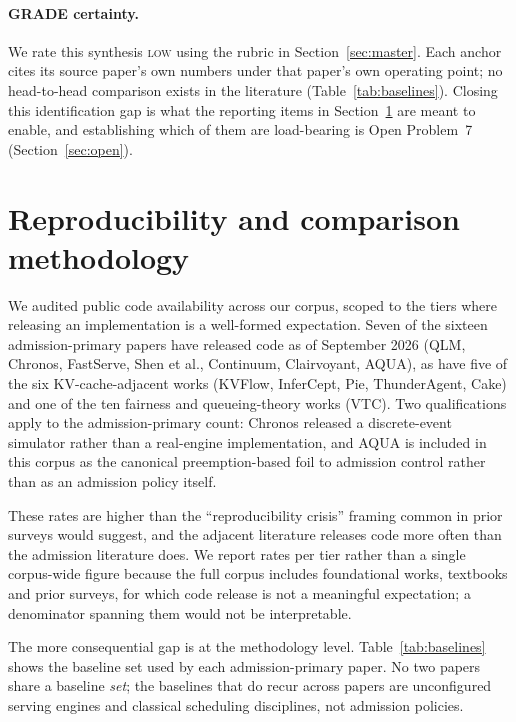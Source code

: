 \documentclass[10pt]{article} %
\theoremstyle{definition}
\begin{document}
\paragraph{GRADE certainty.} We rate this synthesis \textsc{low}
using the rubric in Section~\ref{sec:master}. Each anchor cites its
source paper's own numbers under that paper's own operating point;
no head-to-head comparison exists in the literature
(Table~\ref{tab:baselines}). Closing this identification gap is what
the reporting items in Section~\ref{sec:repro} are meant to enable, and
establishing which of them are load-bearing is Open Problem~7
(Section~\ref{sec:open}).

\section{Reproducibility and comparison methodology}
\label{sec:repro}

We audited public code availability across our corpus, scoped to the
tiers where releasing an implementation is a well-formed expectation.
Seven of the sixteen admission-primary papers have released code as of
September 2026 (QLM, Chronos, FastServe, Shen et al., Continuum,
Clairvoyant, AQUA), as have five of the six KV-cache-adjacent works
(KVFlow, InferCept, Pie, ThunderAgent, Cake) and one of the ten
fairness and queueing-theory works (VTC). Two qualifications apply to
the admission-primary count: Chronos released a discrete-event
simulator rather than a real-engine implementation, and AQUA is
included in this corpus as the canonical preemption-based foil to
admission control rather than as an admission policy itself.

These rates are higher than the ``reproducibility crisis'' framing
common in prior surveys would suggest, and the adjacent literature
releases code more often than the admission literature does. We report
rates per tier rather than a single corpus-wide figure because the full
corpus includes foundational works, textbooks and prior surveys, for
which code release is not a meaningful expectation; a denominator
spanning them would not be interpretable.

The more consequential gap is at the methodology level.
Table~\ref{tab:baselines} shows the baseline set used by each
admission-primary paper. No two papers share a baseline \emph{set}; the
baselines that do recur across papers are unconfigured serving engines
and classical scheduling disciplines, not admission policies.
\end{document}

